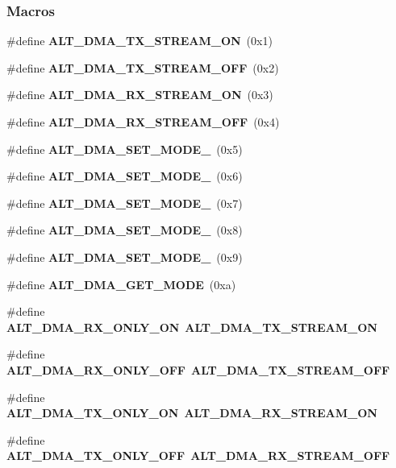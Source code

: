 \subsubsection*{Macros}
\begin{DoxyCompactItemize}
\item 
\#define {\bf A\+L\+T\+\_\+\+D\+M\+A\+\_\+\+T\+X\+\_\+\+S\+T\+R\+E\+A\+M\+\_\+\+ON}~(0x1)
\item 
\#define {\bf A\+L\+T\+\_\+\+D\+M\+A\+\_\+\+T\+X\+\_\+\+S\+T\+R\+E\+A\+M\+\_\+\+O\+FF}~(0x2)
\item 
\#define {\bf A\+L\+T\+\_\+\+D\+M\+A\+\_\+\+R\+X\+\_\+\+S\+T\+R\+E\+A\+M\+\_\+\+ON}~(0x3)
\item 
\#define {\bf A\+L\+T\+\_\+\+D\+M\+A\+\_\+\+R\+X\+\_\+\+S\+T\+R\+E\+A\+M\+\_\+\+O\+FF}~(0x4)
\item 
\#define {\bf A\+L\+T\+\_\+\+D\+M\+A\+\_\+\+S\+E\+T\+\_\+\+M\+O\+D\+E\+\_}~(0x5)
\item 
\#define {\bf A\+L\+T\+\_\+\+D\+M\+A\+\_\+\+S\+E\+T\+\_\+\+M\+O\+D\+E\+\_}~(0x6)
\item 
\#define {\bf A\+L\+T\+\_\+\+D\+M\+A\+\_\+\+S\+E\+T\+\_\+\+M\+O\+D\+E\+\_}~(0x7)
\item 
\#define {\bf A\+L\+T\+\_\+\+D\+M\+A\+\_\+\+S\+E\+T\+\_\+\+M\+O\+D\+E\+\_}~(0x8)
\item 
\#define {\bf A\+L\+T\+\_\+\+D\+M\+A\+\_\+\+S\+E\+T\+\_\+\+M\+O\+D\+E\+\_}~(0x9)
\item 
\#define {\bf A\+L\+T\+\_\+\+D\+M\+A\+\_\+\+G\+E\+T\+\_\+\+M\+O\+DE}~(0xa)
\item 
\#define {\bf A\+L\+T\+\_\+\+D\+M\+A\+\_\+\+R\+X\+\_\+\+O\+N\+L\+Y\+\_\+\+ON}~{\bf A\+L\+T\+\_\+\+D\+M\+A\+\_\+\+T\+X\+\_\+\+S\+T\+R\+E\+A\+M\+\_\+\+ON}
\item 
\#define {\bf A\+L\+T\+\_\+\+D\+M\+A\+\_\+\+R\+X\+\_\+\+O\+N\+L\+Y\+\_\+\+O\+FF}~{\bf A\+L\+T\+\_\+\+D\+M\+A\+\_\+\+T\+X\+\_\+\+S\+T\+R\+E\+A\+M\+\_\+\+O\+FF}
\item 
\#define {\bf A\+L\+T\+\_\+\+D\+M\+A\+\_\+\+T\+X\+\_\+\+O\+N\+L\+Y\+\_\+\+ON}~{\bf A\+L\+T\+\_\+\+D\+M\+A\+\_\+\+R\+X\+\_\+\+S\+T\+R\+E\+A\+M\+\_\+\+ON}
\item 
\#define {\bf A\+L\+T\+\_\+\+D\+M\+A\+\_\+\+T\+X\+\_\+\+O\+N\+L\+Y\+\_\+\+O\+FF}~{\bf A\+L\+T\+\_\+\+D\+M\+A\+\_\+\+R\+X\+\_\+\+S\+T\+R\+E\+A\+M\+\_\+\+O\+FF}
\end{DoxyCompactItemize}
